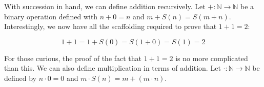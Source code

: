 \documentclass[12pt, titlepage]{article}
\begin{document}
With succession in hand, we can define addition recursively. Let \(+ :
\mathbb{N} \to \mathbb{N}\) be a binary operation defined with \(n + 0 = n\)
and \(m + S(n) = S(m + n)\). Interestingly, we now have all the scaffolding
required to prove that \(1 + 1 = 2\):

\begin{equation*}
  1 + 1 = 1 + S(0) = S(1 + 0) = S(1) = 2
\end{equation*}

For those curious, the proof of the fact that \(1 + 1 = 2\) is no more
complicated than this. We can also define multiplication in terms of addition.
Let \(\cdot : \mathbb{N} \to \mathbb{N}\) be defined by \(n \cdot 0 = 0\) and
\(m \cdot S(n) = m + (m \cdot n)\).
\end{document}
